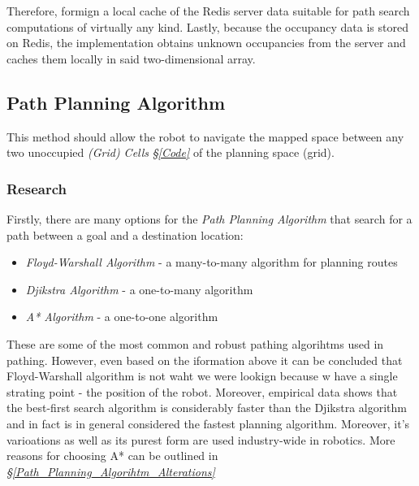 \documentclass[11pt, a4paper]{article}
\begin{document}
Therefore, formign a local cache of the Redis server data suitable for path search computations of virtually any kind. Lastly, because the occupancy data is stored on Redis, the implementation obtains unknown occupancies from the server and caches them locally in said two-dimensional array. 




\subsection{Path Planning Algorithm}
\label{Path_Planning_Algorithm}

This method should allow the robot to navigate the mapped space between any two unoccupied \textit{(Grid) Cells} \textit{\S\ref{Code}} of the planning space (grid). 

\subsubsection{Research}

Firstly, there are many options for the \textit{Path Planning Algorithm} that search for a path between a goal and a destination location:

\begin{itemize}

	\item \textit{Floyd-Warshall Algorithm}\cite{path_warshall} - a many-to-many algorithm for planning routes
	\item \textit{Djikstra Algorithm}\cite{path_warshall} - a one-to-many algorithm
	\item \textit{A* Algorithm}\cite{path_astar}	- a one-to-one algorithm

\end{itemize}

These are some of the most common and robust pathing algorihtms used in pathing. However, even based on the iformation above it can be concluded that Floyd-Warshall algorithm is not waht we were lookign because w have a single strating point - the position of the robot. Moreover, empirical data\cite{path_efficiency} shows that the best-first search algorithm is considerably faster than the Djikstra algorithm and in fact is in general considered the fastest planning algorithm. Moreover, it's varioations as well as its purest form are used industry-wide in robotics. More reasons for choosing A* can be outlined in \textit{\S\ref{Path_Planning_Algorihtm_Alterations}}
\end{document}
